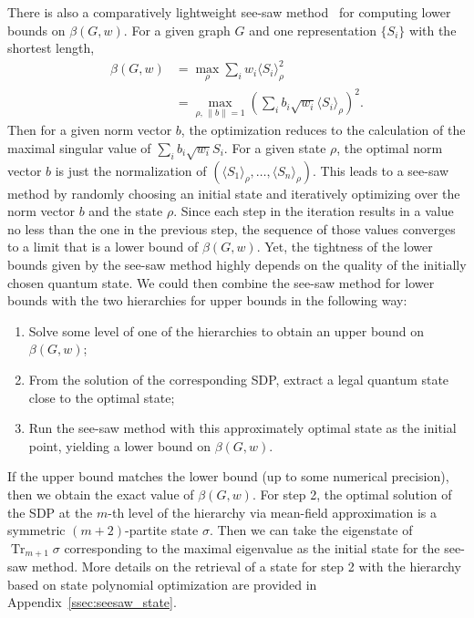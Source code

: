 \documentclass[
12pt,
prx,
aps,
reprint,
a4paper,
longbibliograph,
nofootinbib,
nobibnotes,
superscriptaddress
]{revtex4-2}
\theoremstyle{definition}
\DeclareMathOperator\tr{Tr}
\begin{document}
There is also a comparatively lightweight see-saw method~\cite{xu2023bounding} for computing lower bounds on $\beta(G,w)$. 
For a given graph $G$ and one representation $\{S_i\}$ with the shortest length,
\begin{equation}
\begin{aligned}
    \beta(G,w) & = \max_{\rho} \sum\nolimits_i w_i \langle S_i\rangle^2_{\rho}\\
    &= \max_{\rho,\,\|b\|=1} \left(\sum\nolimits_i b_i\sqrt{w_i}\langle S_i\rangle_{\rho} \right)^2.
\end{aligned}
\end{equation}
Then for a given norm vector $b$, the optimization reduces to the calculation of the maximal singular value of $\sum_i b_i\sqrt{w_i} S_i$. For a given state $\rho$, the optimal norm vector $b$ is just the normalization of $(\langle S_1\rangle_\rho, \ldots, \langle S_n\rangle_\rho)$. This leads to a see-saw method by randomly choosing an initial state and iteratively optimizing over the norm vector $b$ and the state $\rho$. Since each step in the iteration results in a value no less than the one in the previous step, the sequence of those values converges to a limit that is a lower bound of $\beta(G,w)$.
Yet, the tightness of the lower bounds given by the see-saw method highly depends on the quality of the initially chosen quantum state.
We could then combine the see-saw method for lower bounds with the two hierarchies for upper bounds in the following way:
\begin{enumerate}
	\item Solve some level of one of the hierarchies to obtain an upper bound on $\beta(G,w)$;
	\item From the solution of the corresponding SDP, extract a legal quantum state close to the optimal state;
	\item Run the see-saw method with this approximately optimal state as the initial point, yielding a lower bound on $\beta(G,w)$.
\end{enumerate}
If the upper bound matches the lower bound (up to some numerical precision), then we obtain the exact value of $\beta(G,w)$.
For step 2, the optimal solution of the SDP at the $m$-th level of the hierarchy via mean-field approximation is a symmetric $(m+2)$-partite state $\sigma$. Then we can take the eigenstate of $\tr_{m+1}\sigma$ corresponding to the maximal eigenvalue as the initial state for the see-saw method. More details on the retrieval of a state for step 2 with the hierarchy based on state polynomial optimization are provided in Appendix~\ref{ssec:seesaw_state}.
\end{document}
